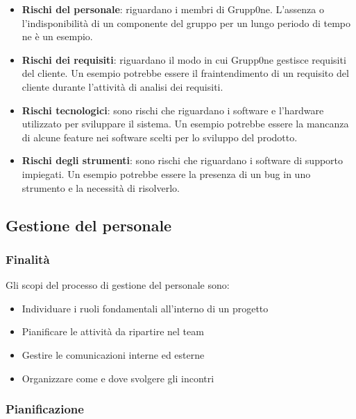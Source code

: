 \documentclass[../norme-di-progetto.tex]{subfiles}
\begin{document}
\begin{itemize}
	\item \textbf{Rischi del personale}: riguardano i membri di Grupp0ne. L'assenza o l'indisponibilità di un componente del gruppo per un lungo periodo di tempo ne è un esempio.
	\item \textbf{Rischi dei requisiti}: riguardano il modo in cui Grupp0ne gestisce requisiti del cliente. Un esempio potrebbe essere il fraintendimento di un requisito del cliente durante l'attività di analisi dei requisiti.
	\item \textbf{Rischi tecnologici}: sono rischi che riguardano i software e l'hardware utilizzato per sviluppare il sistema. Un esempio potrebbe essere la mancanza di alcune feature nei software scelti per lo sviluppo del prodotto.
	\item \textbf{Rischi degli strumenti}: sono rischi che riguardano i software di supporto impiegati. Un esempio potrebbe essere la presenza di un bug in uno strumento e la necessità di risolverlo.
\end{itemize}
\subsection{Gestione del personale}
\label{sub:gestione del personale}
\subsubsection{Finalità}
\label{subs:finalità}
Gli scopi del processo di gestione del personale sono:
\begin{itemize}
	\item Individuare i ruoli fondamentali all'interno di un progetto
	\item Pianificare le attività da ripartire nel team
	\item Gestire le comunicazioni interne ed esterne
	\item Organizzare come e dove svolgere gli incontri
\end{itemize}
\subsubsection{Pianificazione}
\end{document}

